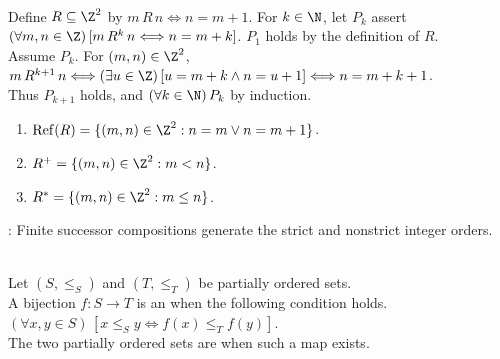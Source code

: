 \begin{example} \label{ex:successor-relation-closures} \\
Define $R\subseteq\Z^2$ by $m\,R\,n\Longleftrightarrow n=m+1$. For $k\in\N$, let $P_k$ assert $(\forall m,n\in\Z)\,[m\,R^k\,n\Longleftrightarrow n=m+k]$. $P_1$ holds by the definition of $R$.\\
Assume $P_k$. For $(m,n)\in\Z^2$, $m\,R^{k+1}\,n\Longleftrightarrow(\exists u\in\Z)\,[u=m+k\land n=u+1]\Longleftrightarrow n=m+k+1$.\\
Thus $P_{k+1}$ holds, and $(\forall k\in\N)\,P_k$ by induction.
\begin{enumerate}[label=(\roman*)]
\setlength{\itemsep}{0pt}
\item $\operatorname{Ref}(R)=\{(m,n)\in\Z^2:n=m\lor n=m+1\}$.
\item $R^+=\{(m,n)\in\Z^2:m<n\}$.
\item $R^*=\{(m,n)\in\Z^2:m\leq n\}$.
\end{enumerate}
: Finite successor compositions generate the strict and nonstrict integer orders.
\end{example}

\begin{definition} \label{def:order-isomorphism} \\
Let $(S,\leq_S)$ and $(T,\leq_T)$ be partially ordered sets.\\
A bijection $f:S\to T$ is an  when the following condition holds. $(\forall x,y\in S)\,[x\leq_Sy\Longleftrightarrow f(x)\leq_Tf(y)]$.\\
The two partially ordered sets are  when such a map exists.
\end{definition}

